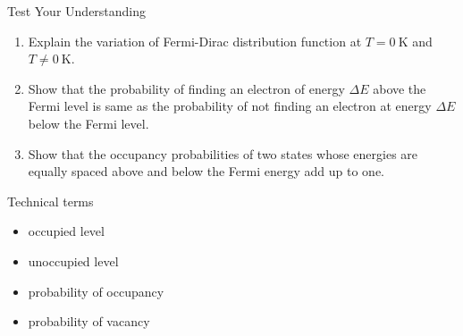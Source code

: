 %
\begin{frame}[label=pre-M2T1-slot1]{Test Your Understanding}
	\begin{enumerate}
		\item Explain the variation of Fermi-Dirac distribution function at \(T=\SI{0}{\kelvin}\) and \(T\neq \SI{0}{\kelvin}\).
		\item Show that the probability of finding an electron of energy \(\Delta E\) above the Fermi level is same as the probability of not finding an electron at energy \(\Delta E\) below the Fermi level.
		\item Show that the occupancy probabilities of two states whose energies are equally spaced above and below the Fermi energy add up to one.
	\end{enumerate}
\end{frame}
%
\begin{frame}[label=pre-M2T1-slot1]{Technical terms}
	\begin{itemize}
		\item occupied level
		\item unoccupied level
		\item probability of occupancy
		\item probability of vacancy
	\end{itemize}
\end{frame}	